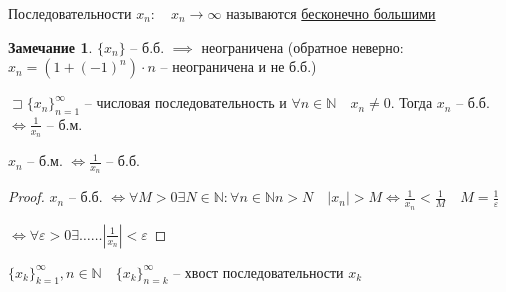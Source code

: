\documentclass{book}
\newcommand\N{\ensuremath{\mathbb{N}}}
\theoremstyle{definition}
\newtheorem*{note}{Замечание}
\begin{document}
    \begin{definition}
        Последовательности $x_n:\quad x_n\to \infty $ называются \underline{бесконечно большими}
    \end{definition}
    \begin{note}
        $\{x_n\}$ -- б.б. $\implies $ неограничена (обратное неверно: $x_{n}  = (1+(-1)^n)\cdot n$ -- неограничена и не б.б.)
    \end{note}
    \begin{lemma}

        $\sqsupset  \{x_n\}_{n=1}^{\infty }$ -- числовая последовательность и $\forall n\in \N  \quad x_n\neq 0$. Тогда $x_{n} $ -- б.б. $\iff \frac{1}{x_{n} }$ -- б.м. 

        $x_{n} $ -- б.м. $\iff  \frac{1}{x_{n} }$ -- б.б.
    \end{lemma}
    \begin{proof}
        $x_{n} $ -- б.б. $\iff  \forall M>0 \exists  N\in \N : \forall n\in \N  n>N\quad |x_n| >M \iff \frac{1}{x_{n} }<\frac{1}{M}\quad M = \frac{1}{\varepsilon}$

        $\iff \forall \varepsilon >0 \exists \ldots\ldots \left| \frac{1}{x_{n} } \right| <\varepsilon$
    \end{proof}

    $\{x_k\}_{k=1}^{\infty }, n\in \N \quad \{x_k\}_{n=k}^{\infty }$ -- хвост последовательности $x_k$
\end{document}

